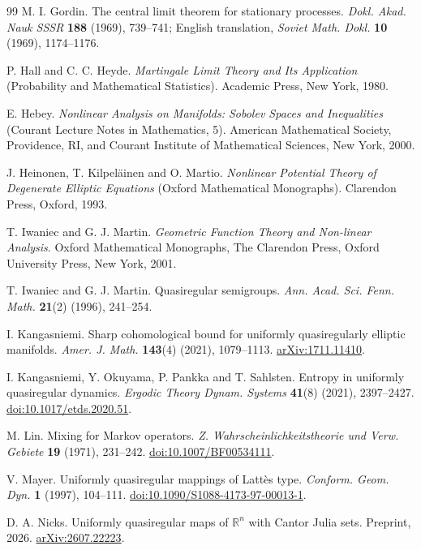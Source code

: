 \documentclass[11pt,reqno]{amsart}
\theoremstyle{plain}
\theoremstyle{definition}
\theoremstyle{remark}
\numberwithin{equation}{section}
\begin{document}
\begin{thebibliography}{99}
M. I. Gordin. The central limit theorem for stationary processes.
\emph{Dokl. Akad. Nauk SSSR} \textbf{188} (1969), 739--741;
English translation, \emph{Soviet Math. Dokl.} \textbf{10} (1969), 1174--1176.

P. Hall and C. C. Heyde. \emph{Martingale Limit Theory and Its Application} (Probability and Mathematical Statistics).
Academic Press, New York, 1980.

E. Hebey. \emph{Nonlinear Analysis on Manifolds: Sobolev Spaces and Inequalities} (Courant Lecture Notes in Mathematics, 5).
American Mathematical Society, Providence, RI, and Courant Institute of Mathematical Sciences, New York, 2000.

J. Heinonen, T. Kilpel\"ainen and O. Martio. \emph{Nonlinear Potential Theory of Degenerate Elliptic Equations} (Oxford Mathematical Monographs).
Clarendon Press, Oxford, 1993.

T. Iwaniec and G. J. Martin. \emph{Geometric Function Theory and Non-linear Analysis}.
Oxford Mathematical Monographs, The Clarendon Press, Oxford University Press, New York, 2001.

T. Iwaniec and G. J. Martin. Quasiregular semigroups.
\emph{Ann. Acad. Sci. Fenn. Math.} \textbf{21}(2) (1996), 241--254.

I. Kangasniemi. Sharp cohomological bound for uniformly quasiregularly elliptic manifolds.
\emph{Amer. J. Math.} \textbf{143}(4) (2021), 1079--1113.
\href{https://arxiv.org/abs/1711.11410}{arXiv:1711.11410}.

I. Kangasniemi, Y. Okuyama, P. Pankka and T. Sahlsten. Entropy in uniformly quasiregular dynamics.
\emph{Ergodic Theory Dynam. Systems} \textbf{41}(8) (2021), 2397--2427.
\href{https://doi.org/10.1017/etds.2020.51}{doi:10.1017/etds.2020.51}.

M. Lin. Mixing for Markov operators.
\emph{Z. Wahrscheinlichkeitstheorie und Verw. Gebiete} \textbf{19} (1971), 231--242.
\href{https://doi.org/10.1007/BF00534111}{doi:10.1007/BF00534111}.

V. Mayer. Uniformly quasiregular mappings of Latt\`es type.
\emph{Conform. Geom. Dyn.} \textbf{1} (1997), 104--111.
\href{https://doi.org/10.1090/S1088-4173-97-00013-1}{doi:10.1090/S1088-4173-97-00013-1}.

D. A. Nicks. Uniformly quasiregular maps of $\mathbb{R}^n$ with Cantor Julia sets.
Preprint, 2026. \href{https://arxiv.org/abs/2607.22223}{arXiv:2607.22223}.


\end{thebibliography}
\end{document}
